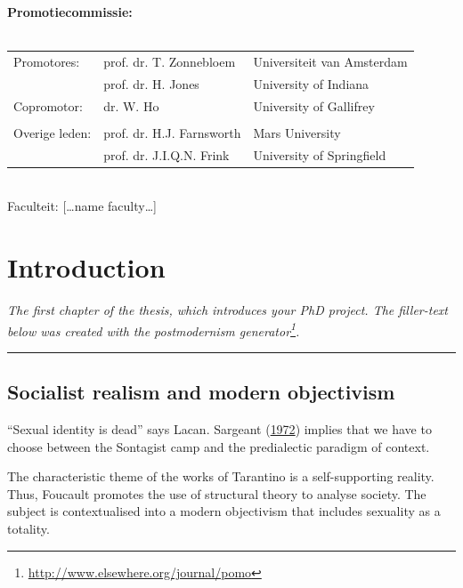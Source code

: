 \documentclass[12pt,english,a4paper,oneside,]{book} %
\renewcommand{\href}[2]{#2\footnote{\url{#1}}}
\let\rmarkdownfootnote\footnote%
\def\footnote{\protect\rmarkdownfootnote}
\theoremstyle{definition}
\theoremstyle{definition}
\theoremstyle{definition}
\theoremstyle{remark}
\begin{document}
\clearpage
\thispagestyle{empty}
\noindent\textbf{Promotiecommissie:}\\
\\
\noindent\begin{tabular}{@{}lll}

Promotores:
&  prof. dr. T. Zonnebloem & Universiteit van Amsterdam\\
&  prof. dr. H. Jones & University of Indiana\\

Copromotor:
&  dr. W. Ho & University of Gallifrey\\

\\
Overige leden:
&  prof. dr. H.J. Farnsworth & Mars University\\
&  prof. dr. J.I.Q.N. Frink & University of Springfield\\
\end{tabular}\\

\noindent Faculteit: […name faculty…]



{
\setcounter{tocdepth}{1}
\tableofcontents
}
\mainmatter
\hypertarget{introduction}{%
\chapter{Introduction}\label{introduction}}

\emph{The first chapter of the thesis, which introduces your PhD project. The filler-text below was created with the \href{http://www.elsewhere.org/journal/pomo}{postmodernism generator}.}

\begin{center}\rule{0.5\linewidth}{0.5pt}\end{center}

\hypertarget{socialist-realism-and-modern-objectivism}{%
\section{Socialist realism and modern objectivism}\label{socialist-realism-and-modern-objectivism}}

``Sexual identity is dead'' says Lacan. Sargeant (\protect\hyperlink{ref-Sargeant1972}{1972}) implies that we have to choose between the Sontagist camp and the predialectic paradigm of context.

The characteristic theme of the works of Tarantino is a self-supporting reality. Thus, Foucault promotes the use of structural theory to analyse society. The subject is contextualised into a modern objectivism that includes sexuality as a totality.
\end{document}
